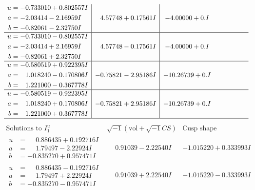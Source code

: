 \documentclass[1p]{elsarticle_modified}
\theoremstyle{definition}
\newcommand{\I}{\sqrt{-1}}
\begin{document}
$$\begin{array}{c|c|c}
\begin{aligned}
u &= -0.733010 + 0.802557 I \\
a &= -2.03414 - 2.16959 I \\
b &= -0.82061 - 2.32750 I\end{aligned}
 & \phantom{-}4.57748 + 0.17561 I & -4.00000 + 0. I\phantom{ +0.000000I} \\ \hline\begin{aligned}
u &= -0.733010 - 0.802557 I \\
a &= -2.03414 + 2.16959 I \\
b &= -0.82061 + 2.32750 I\end{aligned}
 & \phantom{-}4.57748 - 0.17561 I & -4.00000 + 0. I\phantom{ +0.000000I} \\ \hline\begin{aligned}
u &= -0.580519 + 0.922395 I \\
a &= \phantom{-}1.018240 - 0.170806 I \\
b &= \phantom{-}1.221000 - 0.367778 I\end{aligned}
 & -0.75821 - 2.95186 I & -10.26739 + 0. I\phantom{ +0.000000I} \\ \hline\begin{aligned}
u &= -0.580519 - 0.922395 I \\
a &= \phantom{-}1.018240 + 0.170806 I \\
b &= \phantom{-}1.221000 + 0.367778 I\end{aligned}
 & -0.75821 + 2.95186 I & -10.26739 + 0. I\phantom{ +0.000000I}\\
 \hline 
 \end{array}$$\newpage$$\begin{array}{c|c|c}  
\text{Solutions to }I^u_{1}& \I (\text{vol} + \sqrt{-1}CS) & \text{Cusp shape}\\
 \hline 
\begin{aligned}
u &= \phantom{-}0.886435 + 0.192716 I \\
a &= \phantom{-}1.79497 - 2.22924 I \\
b &= -0.835270 + 0.957471 I\end{aligned}
 & \phantom{-}0.91039 - 2.22540 I & -1.015220 + 0.333993 I \\ \hline\begin{aligned}
u &= \phantom{-}0.886435 - 0.192716 I \\
a &= \phantom{-}1.79497 + 2.22924 I \\
b &= -0.835270 - 0.957471 I\end{aligned}
 & \phantom{-}0.91039 + 2.22540 I & -1.015220 - 0.333993 I \\ \hline\begin{aligned}

\end{aligned}
\end{array}$$
\end{document}
